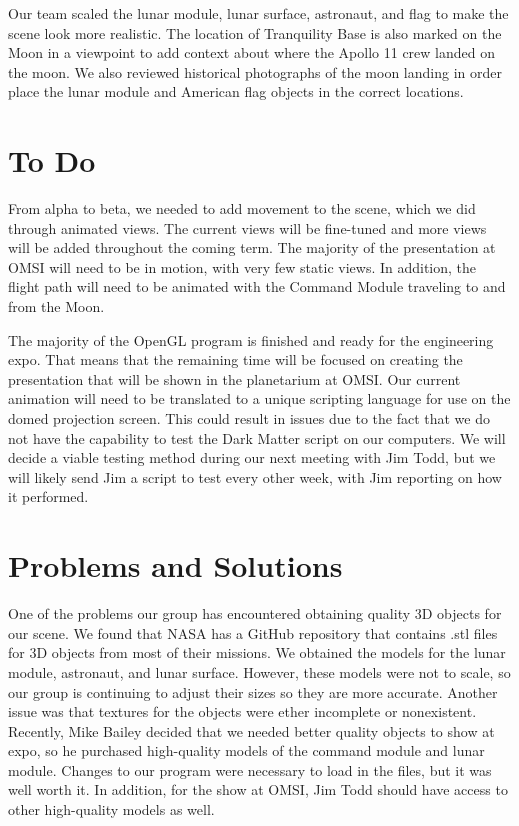 \documentclass[onecolumn, draftclsnofoot,10pt, compsoc]{IEEEtran}
\begin{document}
Our team scaled the lunar module, lunar surface, astronaut, and flag to make the scene look more realistic. The location of Tranquility Base is also marked on the Moon in a viewpoint to add context about where the Apollo 11 crew landed on the moon. We also reviewed historical photographs of the moon landing in order place the lunar module and American flag objects in the correct locations.

\section{To Do}

From alpha to beta, we needed to add movement to the scene, which we did through animated views. The current views will be fine-tuned and more views will be added throughout the coming term. The majority of the presentation at OMSI will need to be in motion, with very few static views. In addition, the flight path will need to be animated with the Command Module traveling to and from the Moon. 

The majority of the OpenGL program is finished and ready for the engineering expo. That means that the remaining time will be focused on creating the presentation that will be shown in the planetarium at OMSI. Our current animation will need to be translated to a unique scripting language for use on the domed projection screen. This could result in issues due to the fact that we do not have the capability to test the Dark Matter script on our computers. We will decide a viable testing method during our next meeting with Jim Todd, but we will likely send Jim a script to test every other week, with Jim reporting on how it performed. 


\section{Problems and Solutions}

One of the problems our group has encountered obtaining quality 3D objects for our scene. We found that NASA has a GitHub repository that contains .stl files for 3D objects from most of their missions. We obtained the models for the lunar module, astronaut, and lunar surface. However, these models were not to scale, so our group is continuing to adjust their sizes so they are more accurate. Another issue was that textures for the objects were ether incomplete or nonexistent. Recently, Mike Bailey decided that we needed better quality objects to show at expo, so he purchased high-quality models of the command module and lunar module. Changes to our program were necessary to load in the files, but it was well worth it. In addition, for the show at OMSI, Jim Todd should have access to other high-quality models as well.  
\end{document}
